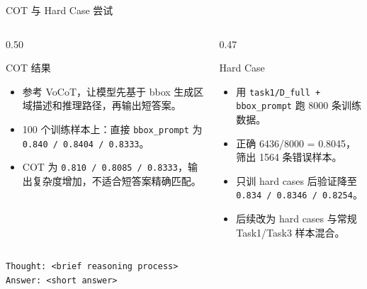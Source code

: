 \documentclass{beamer}
\newcommand{\metric}[3]{\texttt{#1 / #2 / #3}}
\begin{document}
\begin{frame}[fragile]{COT 与 Hard Case 尝试}
\small
\begin{columns}[T,onlytextwidth]
\begin{column}{0.50\textwidth}
\begin{block}{COT 结果}
\begin{itemize}
\item 参考 VoCoT，让模型先基于 bbox 生成区域描述和推理路径，再输出短答案。
\item 100 个训练样本上：直接 \texttt{bbox\_prompt} 为 \metric{0.840}{0.8404}{0.8333}。
\item COT 为 \metric{0.810}{0.8085}{0.8333}，输出复杂度增加，不适合短答案精确匹配。
\end{itemize}
\end{block}
\end{column}
\begin{column}{0.47\textwidth}
\begin{block}{Hard Case}
\begin{itemize}
\item 用 \texttt{task1/D\_full + bbox\_prompt} 跑 8000 条训练数据。
\item 正确 6436/8000 = 0.8045，筛出 1564 条错误样本。
\item 只训 hard cases 后验证降至 \metric{0.834}{0.8346}{0.8254}。
\item 后续改为 hard cases 与常规 Task1/Task3 样本混合。
\end{itemize}
\end{block}
\end{column}
\end{columns}
\vspace{0.2em}
\scriptsize
\begin{verbatim}
Thought: <brief reasoning process>
Answer: <short answer>
\end{verbatim}
\end{frame}
\end{document}
